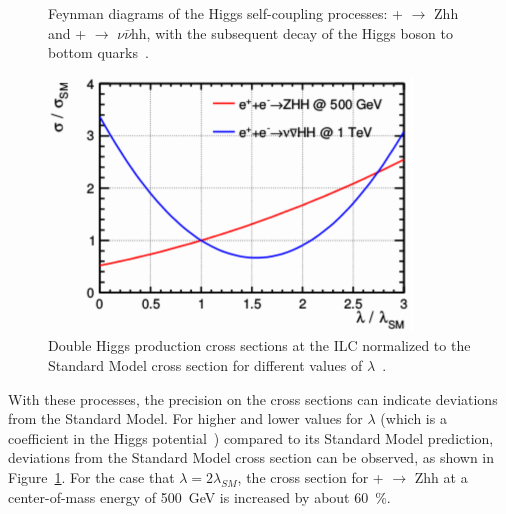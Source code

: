 \begin{figure}
\centering
 \begin{minipage}[t]{0.55\textwidth}
\centering
{}
\caption[Feynman diagrams of double Higgs production processes]{Feynman diagrams of the Higgs self-coupling processes: \positron + \electron $\rightarrow$ Zhh and \positron + \electron$ \rightarrow$ $\nu\bar{\nu}$hh, with the subsequent decay of the Higgs boson to bottom quarks~\cite{ttH_coupling}.}
\label{fig:DoubleHiggsFeynman}
\end{minipage}
\hfill
\begin{minipage}[t]{0.44\textwidth}
\centering
\includegraphics[width=\textwidth]{Figures/DoubleHiggs.pdf}
\caption[Double Higgs production cross sections]{Double Higgs production cross sections at the ILC normalized to the Standard Model cross section for different values of $\lambda$~\cite[p. 23]{ILC_Discovery}.}
\label{fig:DoubleHiggs}
\end{minipage}
\end{figure}
With these processes, the precision on the cross sections can indicate deviations from the Standard Model.
For higher and lower values for $\lambda$ (which is a coefficient in the Higgs potential~\cite[p. 174]{PDG}) compared to its Standard Model prediction, deviations from the Standard Model cross section can be observed, as shown in Figure~\ref{fig:DoubleHiggs}.
For the case that $\lambda = 2\lambda_{SM}$, the cross section for \positron + \electron $\rightarrow$ Zhh at a center-of-mass energy of \SI{500}{\GeV} is increased by about \SI{60}{\percent}.


